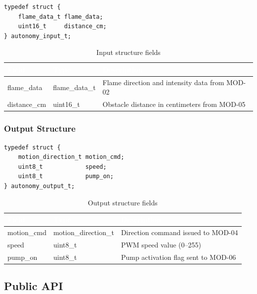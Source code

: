 \documentclass[12pt,a4paper]{article}
\newcommand{\theadtext}[1]{\textcolor{white}{\textbf{#1}}}
\newcommand{\fn}[1]{{\footnotesize\ttfamily #1}}
\begin{document}
\begin{lstlisting}[caption={autonomy\_input\_t definition}]
typedef struct {
    flame_data_t flame_data;
    uint16_t     distance_cm;
} autonomy_input_t;
\end{lstlisting}

\begin{table}[H]\centering\small
\begin{tabularx}{\textwidth}{L{3cm} L{3cm} X}
\toprule
{}\theadtext{Field} & \theadtext{Type} & \theadtext{Description} \\
\midrule
{}   \fn{flame\_data}   & \fn{flame\_data\_t} & Flame direction and intensity data from MOD-02 \\
 \fn{distance\_cm}  & \fn{uint16\_t}      & Obstacle distance in centimeters from MOD-05 \\
\bottomrule
\end{tabularx}
\caption{Input structure fields}
\end{table}

\subsubsection{Output Structure}

\begin{lstlisting}[caption={autonomy\_output\_t definition}]
typedef struct {
    motion_direction_t motion_cmd;
    uint8_t            speed;
    uint8_t            pump_on;
} autonomy_output_t;
\end{lstlisting}

\begin{table}[H]\centering\small
\begin{tabularx}{\textwidth}{L{3cm} L{3cm} X}
\toprule
{}\theadtext{Field} & \theadtext{Type} & \theadtext{Description} \\
\midrule
{}   \fn{motion\_cmd} & \fn{motion\_direction\_t} & Direction command issued to MOD-04 \\
 \fn{speed}       & \fn{uint8\_t}            & PWM speed value (0--255) \\
   \fn{pump\_on}    & \fn{uint8\_t}            & Pump activation flag sent to MOD-06 \\
\bottomrule
\end{tabularx}
\caption{Output structure fields}
\end{table}

\subsection{Public API}
\end{document}
